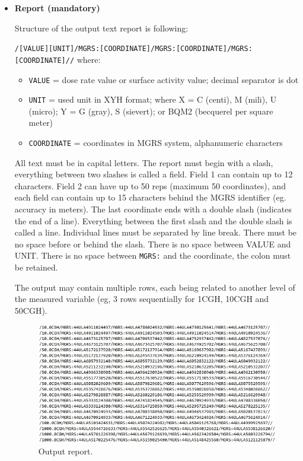 \begin{itemize}
\item{\textbf{Report (mandatory)} 

Structure of the output text report is following:

\texttt{/{[}VALUE{]}{[}UNIT{]}/MGRS:{[}COORDINATE{]}/MGRS:{[}COORDINATE{]}/MGRS:{[}COORDINATE{]}//}
  where:

  \begin{itemize}
  \item{\texttt{VALUE} = dose rate value or surface activity value; decimal separator
    is dot}
  \item{\texttt{UNIT} = used unit in XYH format; where X = C (centi), M (mili), U
    (micro); Y = G (gray), S (sievert); or BQM2 (becquerel per square
    meter)}
  \item{\texttt{COORDINATE} = coordinates in MGRS system, alphanumeric characters}
  \end{itemize}

  All text must be in capital letters. The report must begin with a
  slash, everything between two slashes is called a field. Field 1 can
  contain up to 12 characters. Field 2 can have up to 50 reps (maximum
  50 coordinates), and each field can contain up to 15 characters behind
  the MGRS identifier (eg. accuracy in meters). The last coordinate ends
  with a double slash (indicates the end of a line). Everything between
  the first slash and the double slash is called a line. Individual
  lines must be separated by line break. There must be no space before
  or behind the slash. There is no space between VALUE and UNIT. There
  is no space between \texttt{MGRS:} and the coordinate, the colon must be
  retained.

  The output may contain multiple rows, each being related to another
  level of the measured variable (eg, 3 rows sequentially for 1CGH,
  10CGH and 50CGH).}

\begin{figure}[H]
    \centering
      \includegraphics[width=375pt]{./pictures/vystupni_report.jpg}
      \caption{Output report.}
      \label{fig:report}
\end{figure}
      

\end{itemize}
